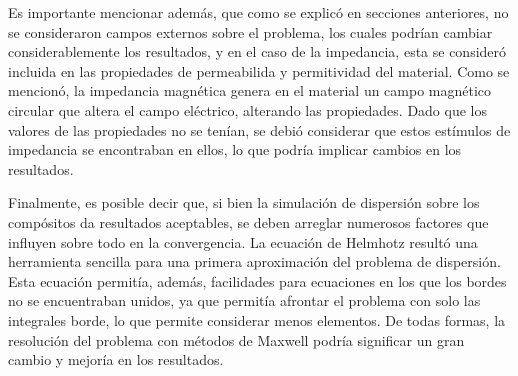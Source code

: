 \documentclass[12pt,letterpaper]{article}
\numberwithin{equation}{section}
\begin{document}
Es importante mencionar además, que como se explicó en secciones anteriores, no se consideraron campos externos sobre el problema, los cuales podrían cambiar considerablemente los resultados, y en el caso de la impedancia, esta se consideró incluida en las propiedades de permeabilida y permitividad del material. Como se mencionó, la impedancia magnética genera en el material un campo magnético circular que altera el campo eléctrico, alterando las propiedades. Dado que los valores de las propiedades no se tenían, se debió considerar que estos estímulos de impedancia se encontraban en ellos, lo que podría implicar cambios en los resultados.

Finalmente, es posible decir que, si bien la simulación de dispersión sobre los compósitos da resultados aceptables, se deben arreglar numerosos factores que influyen sobre todo en la convergencia. La ecuación de Helmhotz resultó una herramienta sencilla para una primera aproximación del problema de dispersión. Esta ecuación permitía, además, facilidades para ecuaciones en los que los bordes no se encuentraban unidos, ya que permitía afrontar el problema con solo las integrales borde, lo que permite considerar menos elementos. De todas formas, la resolución del problema con métodos de Maxwell podría significar un gran cambio y mejoría en los resultados.
\pagebreak
{}%
\end{document}
